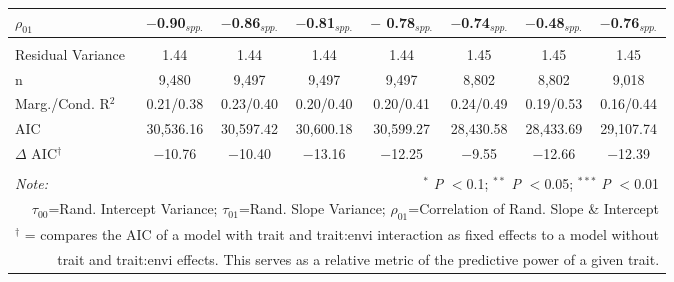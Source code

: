 \documentclass[12pt, letterpaper]{article}
\begin{document}
\begin{table}[h]
{\begin{tabular}{lccccccc}
 $\rho_{01}$ & $-$0.90$_{spp.}$ & $-$0.86$_{spp.}$ & $-$0.81$_{spp.}$ & $-$ 0.78$_{spp.}$ & $-$0.74$_{spp.}$ & $-$0.48$_{spp.}$ & $-$0.76$_{spp.}$ \\
\hline \\[-1.8ex] 
\rowcolor[gray]{.95} Residual Variance & 1.44 & 1.44 & 1.44 & 1.44 & 1.45 & 1.45 & 1.45 \\
n & 9,480 & 9,497 & 9,497 & 9,497 & 8,802 & 8,802 & 9,018 \\ 
\rowcolor[gray]{.95} Marg./Cond. R$^2$ & 0.21/0.38 & 0.23/0.40	& 0.20/0.40 & 0.20/0.41	& 0.24/0.49 & 0.19/0.53 & 0.16/0.44\\
AIC & 30,536.16 & 30,597.42 & 30,600.18 & 30,599.27 & 28,430.58 & 28,433.69 & 29,107.74 \\ 
\hline 
\rowcolor[gray]{.95}$\Delta$ AIC$^\dagger$ & $-$10.76 & $-$10.40 & $-$13.16 & $-$12.25 & $-$9.55 & $-$12.66 & $-$12.39 \\
\hline 
\hline \\[-1.8ex] 
\textit{Note:} & \multicolumn{7}{r}{$^{*}$ \textit{P} $<$0.1; $^{**}$ \textit{P} $<$0.05; $^{***}$ \textit{P} $<$0.01}\\
\multicolumn{8}{r}{$\tau_{00}$=Rand. Intercept Variance; $\tau_{01}$=Rand. Slope Variance; $\rho_{01}$=Correlation of Rand. Slope \& Intercept}\\ 
\multicolumn{8}{r}{$^\dagger$ = compares the AIC of a model with trait and trait:envi interaction as fixed effects to a model without}\\
\multicolumn{8}{r}{trait and trait:envi effects. This serves as a relative metric of the predictive power of a given trait.}
\end{tabular}} 
\end{table} 
\end{document}
